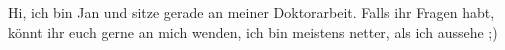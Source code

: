\begin{multicols*}{2}
{Hi, ich bin Jan und sitze gerade an meiner Doktorarbeit. Falls ihr Fragen habt, könnt ihr euch gerne an mich wenden, ich bin meistens netter, als ich aussehe ;)
	\vspace{\baselineskip}
}



\end{multicols*}
